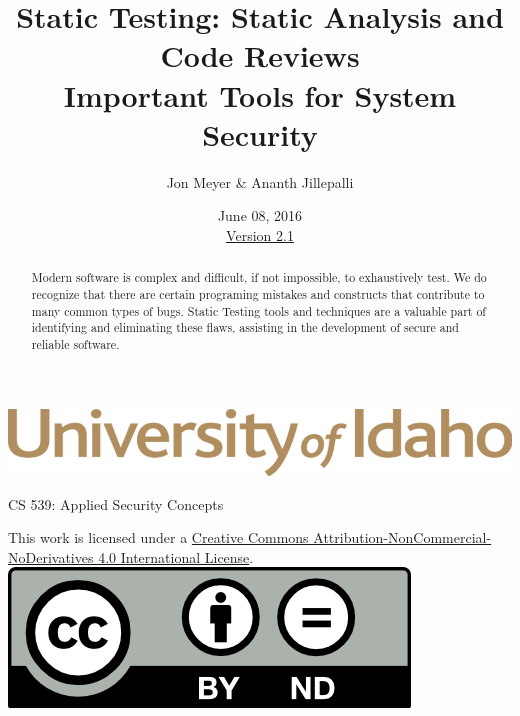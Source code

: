\documentclass[12pt]{extarticle}
\begin{document}
\title{ Static Testing: Static Analysis and Code Reviews \\ \large Important Tools for System Security}
\author{Jon Meyer \& Ananth Jillepalli}
\date{June 08, 2016 \\ \hyperref[changelog]{Version 2.1}} %
\renewcommand{\abstractname}{Summary}
\begin{titlepage}
\maketitle
{}
\begin{center}
\includegraphics[scale=.5]{UofI}

\large{CS 539: Applied Security Concepts}

\vskip 40pt

\end{center}
\begin{abstract}
Modern software is complex and difficult, if not impossible, to exhaustively test.  We do recognize that there are certain programing mistakes and constructs that contribute to many common types of bugs.  Static Testing tools and techniques are a valuable part of identifying and eliminating these flaws, assisting in the development of secure and reliable software.
\end{abstract}


\vfill
\begin{center}
This work is licensed under a \href{https://creativecommons.org/licenses/by-nc-nd/2.0/}{Creative Commons Attribution-NonCommercial-NoDerivatives 4.0 International License}.
\vskip 10pt
\includegraphics[scale=.5]{cc}
\end{center}

\end{titlepage}


\pagebreak
\tableofcontents
\end{document}
